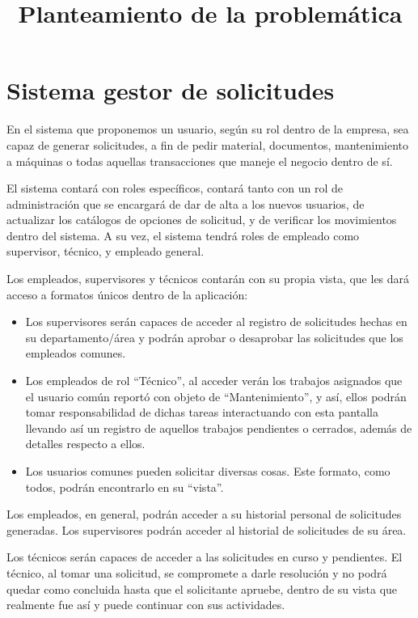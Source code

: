 \documentclass{article}
\title{Planteamiento de la problemática}
\date{}
\begin{document}
\maketitle

\section*{Sistema gestor de solicitudes}

En el sistema que proponemos un usuario, según su rol dentro de la empresa, sea capaz de generar solicitudes, a fin de pedir material, documentos, mantenimiento a máquinas o todas aquellas transacciones que maneje el negocio dentro de sí.

El sistema contará con roles específicos, contará tanto con un rol de administración que se encargará de dar de alta a los nuevos usuarios, de actualizar los catálogos de opciones de solicitud, y de verificar los movimientos dentro del sistema. A su vez, el sistema tendrá roles de empleado como supervisor, técnico, y empleado general.

Los empleados, supervisores y técnicos contarán con su propia vista, que les dará acceso a formatos únicos dentro de la aplicación:
\begin{itemize}
    \item Los supervisores serán capaces de acceder al registro de solicitudes hechas en su departamento/área y podrán aprobar o desaprobar las solicitudes que los empleados comunes.
    \item Los empleados de rol “Técnico”, al acceder verán los trabajos asignados que el usuario común reportó con objeto de “Mantenimiento”, y así, ellos podrán tomar responsabilidad de dichas tareas interactuando con esta pantalla llevando así un registro de aquellos trabajos pendientes o cerrados, además de detalles respecto a ellos.
    \item Los usuarios comunes pueden solicitar diversas cosas. Este formato, como todos, podrán encontrarlo en su “vista”.
\end{itemize}

Los empleados, en general, podrán acceder a su historial personal de solicitudes generadas. Los supervisores podrán acceder al historial de solicitudes de su área.

Los técnicos serán capaces de acceder a las solicitudes en curso y pendientes. El técnico, al tomar una solicitud, se compromete a darle resolución y no podrá quedar como concluida hasta que el solicitante apruebe, dentro de su vista que realmente fue así y puede continuar con sus actividades.
\end{document}
